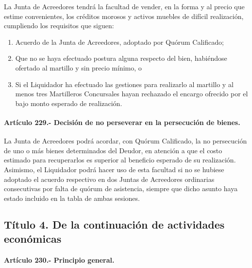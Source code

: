 \documentclass[
]{book}
\begin{document}
La Junta de Acreedores tendrá la facultad de vender, en la forma y al precio que estime convenientes, los créditos morosos y activos muebles de difícil realización, cumpliendo los requisitos que siguen:

\begin{enumerate}
\def\labelenumi{\arabic{enumi})}
\item
  Acuerdo de la Junta de Acreedores, adoptado por Quórum Calificado;
\item
  Que no se haya efectuado postura alguna respecto del bien, habiéndose ofertado al martillo y sin precio mínimo, o
\item
  Si el Liquidador ha efectuado las gestiones para realizarlo al martillo y al menos tres Martilleros Concursales hayan rechazado el encargo ofrecido por el bajo monto esperado de realización.
\end{enumerate}

\hypertarget{artuxedculo-229.--decisiuxf3n-de-no-perseverar-en-la-persecuciuxf3n-de-bienes.}{%
\paragraph*{Artículo 229.- Decisión de no perseverar en la persecución de bienes.}\label{artuxedculo-229.--decisiuxf3n-de-no-perseverar-en-la-persecuciuxf3n-de-bienes.}}

La Junta de Acreedores podrá acordar, con Quórum Calificado, la no persecución de uno o más bienes determinados del Deudor, en atención a que el costo estimado para recuperarlos es superior al beneficio esperado de su realización. Asimismo, el Liquidador podrá hacer uso de esta facultad si no se hubiese adoptado el acuerdo respectivo en dos Juntas de Acreedores ordinarias consecutivas por falta de quórum de asistencia, siempre que dicho asunto haya estado incluido en la tabla de ambas sesiones.

\hypertarget{tuxedtulo-4.-de-la-continuaciuxf3n-de-actividades-econuxf3micas}{%
\subsection*{Título 4. De la continuación de actividades económicas}\label{tuxedtulo-4.-de-la-continuaciuxf3n-de-actividades-econuxf3micas}}

\hypertarget{artuxedculo-230.--principio-general.}{%
\paragraph*{Artículo 230.- Principio general.}\label{artuxedculo-230.--principio-general.}}
\end{document}
